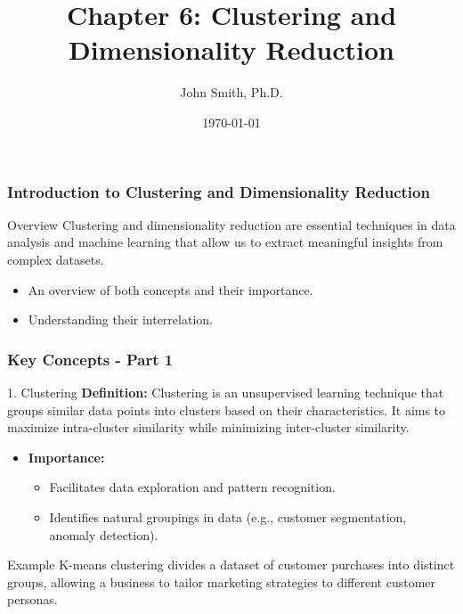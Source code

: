 \documentclass[aspectratio=169]{beamer}
\title[Clustering and Dimensionality Reduction]{Chapter 6: Clustering and Dimensionality Reduction}
\author{John Smith, Ph.D.}
\institute{Department of Computer Science\\ University Name}
\date{\today}
\begin{document}
\frame{\titlepage}

\begin{frame}[fragile]
    \frametitle{Introduction to Clustering and Dimensionality Reduction}
    \begin{block}{Overview}
        Clustering and dimensionality reduction are essential techniques in data analysis and machine learning that allow us to extract meaningful insights from complex datasets. 
    \end{block}
    \begin{itemize}
        \item An overview of both concepts and their importance.
        \item Understanding their interrelation.
    \end{itemize}
\end{frame}

\begin{frame}[fragile]
    \frametitle{Key Concepts - Part 1}
    \begin{block}{1. Clustering}
        \textbf{Definition:} Clustering is an unsupervised learning technique that groups similar data points into clusters based on their characteristics. 
        It aims to maximize intra-cluster similarity while minimizing inter-cluster similarity.
    \end{block}
    \begin{itemize}
        \item \textbf{Importance:} 
        \begin{itemize}
            \item Facilitates data exploration and pattern recognition.
            \item Identifies natural groupings in data (e.g., customer segmentation, anomaly detection).
        \end{itemize}
    \end{itemize}
    \begin{block}{Example}
        K-means clustering divides a dataset of customer purchases into distinct groups, allowing a business to tailor marketing strategies to different customer personas.
    \end{block}
\end{frame}
\end{document}
